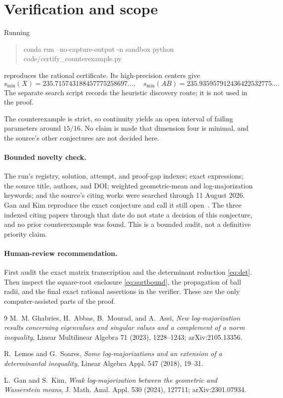 \documentclass[11pt]{article}
\newcommand{\smin}{s_{\min}}
\begin{document}
\section{Verification and scope}

Running
\begin{quote}\ttfamily\small
conda run --no-capture-output -n sandbox python
code/certify\_counterexample.py
\end{quote}
reproduces the rational certificate.  Its high-precision centers give
\[
\smin(X)=235.715743188457775258697\ldots,
\quad
\smin(AB)=235.935957912436422532775\ldots.
\]
The separate search script records the heuristic discovery route; it is not
used in the proof.

The counterexample is strict, so continuity yields an open interval of failing
parameters around $15/16$.  No claim is made that dimension four is minimal,
and the source's other conjectures are not decided here.

\paragraph{Bounded novelty check.}
The run's registry, solution, attempt, and proof-gap indexes; exact expressions;
the source title, authors, and DOI; weighted geometric-mean and
log-majorization keywords; and the source's citing works were searched through
11 August 2026.  Gan and Kim reproduce the exact conjecture and call it still
open~\cite[Sec.~3]{GK}.  The three indexed citing papers through that date do
not state a decision of this conjecture, and no prior counterexample was found.
This is a bounded audit, not a definitive priority claim.

\paragraph{Human-review recommendation.}
First audit the exact matrix transcription and the determinant reduction
\eqref{eq:det}.  Then inspect the square-root enclosure
\eqref{eq:sqrtbound}, the propagation of ball radii, and the final exact
rational assertions in the verifier.  These are the only computer-assisted
parts of the proof.

\begin{thebibliography}{9}
M.~M. Ghabries, H.~Abbas, B.~Mourad, and A.~Assi,
\emph{New log-majorization results concerning eigenvalues and singular values
and a complement of a norm inequality}, Linear Multilinear Algebra 71 (2023),
1228--1243; arXiv:2105.13356.

R.~Lemos and G.~Soares,
\emph{Some log-majorizations and an extension of a determinantal inequality},
Linear Algebra Appl. 547 (2018), 19--31.

L.~Gan and S.~Kim,
\emph{Weak log-majorization between the geometric and Wasserstein means},
J. Math. Anal. Appl. 530 (2024), 127711; arXiv:2301.07934.
\end{thebibliography}
\end{document}
